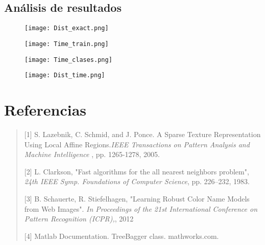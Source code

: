 \documentclass[10pt,twocolumn,letterpaper]{article}
\begin{document}
\subsection{Análisis de resultados}

\begin{figure}[ht]
\centering

 \texttt{[image: Dist\_exact.png]}

\end{figure}


\begin{figure}[ht]
\centering

 \texttt{[image: Time\_train.png]}

\end{figure}

\begin{figure}[ht]
\centering

 \texttt{[image: Time\_clases.png]}

\end{figure}

\begin{figure}[ht]
\centering

 \texttt{[image: Dist\_time.png]}

\end{figure}

\section{Referencias}

\begin{quote}
   
[1] S. Lazebnik, C. Schmid, and J. Ponce. A Sparse Texture Representation Using Local Affine Regions.\textit{IEEE Transactions on Pattern Analysis and Machine Intelligence} ,  pp. 1265-1278, 2005.
   
   [2] L. Clarkson, "Fast algorithms for the all nearest neighbors problem", \textit{24th IEEE Symp. Foundations of Computer Science}, pp. 226–232, 1983.
   
   [3] B. Schauerte, R. Stiefelhagen, "Learning Robust Color Name Models from Web Images". \textit{In Proceedings of the 21st International Conference on Pattern Recognition (ICPR),}, 2012
    
   [4] Matlab Documentation. TreeBagger class. mathworks.com.
   
\end{quote}

{\small


}
\end{document}
